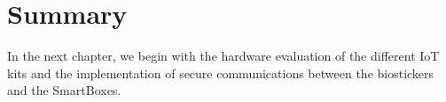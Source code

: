 \section{Summary}

In the next chapter, we begin with the hardware evaluation of the different \acs{IoT} kits and the implementation of secure communications between the biostickers and the SmartBoxes.




\bigskip
